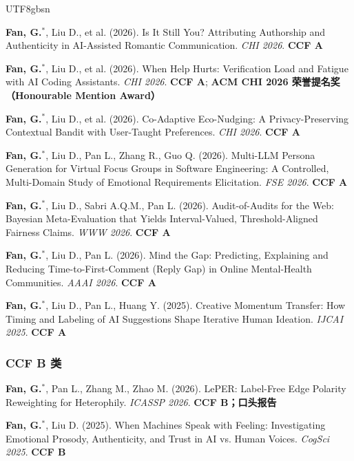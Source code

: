 \documentclass[a4paper,10pt]{article}
\newcommand{\pubitem}[1]{\item #1}
\begin{document}
\begin{CJK*}{UTF8}{gbsn}
\begin{enumerate}[label={[C\arabic*]}]
    \pubitem{\textbf{Fan, G.}$^*$, Liu D., et al. (2026). Is It Still You? Attributing Authorship and Authenticity in AI-Assisted Romantic Communication. \textit{CHI 2026}. \textbf{CCF A}}
    
    \pubitem{\textbf{Fan, G.}$^*$, Liu D., et al. (2026). When Help Hurts: Verification Load and Fatigue with AI Coding Assistants. \textit{CHI 2026}. \textbf{CCF A}; \textbf{ACM CHI 2026 荣誉提名奖（Honourable Mention Award）}}
    
    \pubitem{\textbf{Fan, G.}$^*$, Liu D., et al. (2026). Co-Adaptive Eco-Nudging: A Privacy-Preserving Contextual Bandit with User-Taught Preferences. \textit{CHI 2026}. \textbf{CCF A}}
    
    \pubitem{\textbf{Fan, G.}$^*$, Liu D., Pan L., Zhang R., Guo Q. (2026). Multi-LLM Persona Generation for Virtual Focus Groups in Software Engineering: A Controlled, Multi-Domain Study of Emotional Requirements Elicitation. \textit{FSE 2026}. \textbf{CCF A}}
    
    \pubitem{\textbf{Fan, G.}$^*$, Liu D., Sabri A.Q.M., Pan L. (2026). Audit-of-Audits for the Web: Bayesian Meta-Evaluation that Yields Interval-Valued, Threshold-Aligned Fairness Claims. \textit{WWW 2026}. \textbf{CCF A}}
    
    \pubitem{\textbf{Fan, G.}$^*$, Liu D., Pan L. (2026). Mind the Gap: Predicting, Explaining and Reducing Time-to-First-Comment (Reply Gap) in Online Mental-Health Communities. \textit{AAAI 2026}. \textbf{CCF A}}
    
    \pubitem{\textbf{Fan, G.}$^*$, Liu D., Pan L., Huang Y. (2025). Creative Momentum Transfer: How Timing and Labeling of AI Suggestions Shape Iterative Human Ideation. \textit{IJCAI 2025}. \textbf{CCF A}}
\end{enumerate}

\subsubsection*{CCF B 类}

\begin{enumerate}[label={[C\arabic*]}, resume]
    \pubitem{\textbf{Fan, G.}$^*$, Pan L., Zhang M., Zhao M. (2026). LePER: Label-Free Edge Polarity Reweighting for Heterophily. \textit{ICASSP 2026}. \textbf{CCF B；口头报告}}
    
    \pubitem{\textbf{Fan, G.}$^*$, Liu D. (2025). When Machines Speak with Feeling: Investigating Emotional Prosody, Authenticity, and Trust in AI vs. Human Voices. \textit{CogSci 2025}. \textbf{CCF B}}
    

\end{enumerate}
\end{CJK*}
\end{document}

